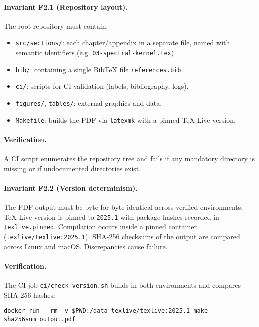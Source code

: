 \paragraph{Invariant F2.1 (Repository layout).}
The root repository must contain:
\begin{itemize}
  \item \texttt{src/sections/}: each chapter/appendix in a separate file,
        named with semantic identifiers (e.g.
        \texttt{03-spectral-kernel.tex}).
  \item \texttt{bib/}: containing a single BibTeX file
        \texttt{references.bib}.
  \item \texttt{ci/}: scripts for CI validation (labels, bibliography,
        logs).
  \item \texttt{figures/}, \texttt{tables/}: external graphics and data.
  \item \texttt{Makefile}: builds the PDF via \texttt{latexmk} with a
        pinned TeX Live version.
\end{itemize}

\paragraph{Verification.}
A CI script enumerates the repository tree and fails if any mandatory
directory is missing or if undocumented directories exist.

\paragraph{Invariant F2.2 (Version determinism).}
The PDF output must be byte-for-byte identical across verified
environments. TeX Live version is pinned to
\texttt{2025.1} with package hashes recorded in
\texttt{texlive.pinned}. Compilation occurs inside a pinned container
(\texttt{texlive/texlive:2025.1}). SHA-256 checksums of the output are
compared across Linux and macOS. Discrepancies cause failure.

\paragraph{Verification.}
The CI job \texttt{ci/check-version.sh} builds in both environments and
compares SHA-256 hashes:
\begin{verbatim}
docker run --rm -v $PWD:/data texlive/texlive:2025.1 make
sha256sum output.pdf
\end{verbatim}

